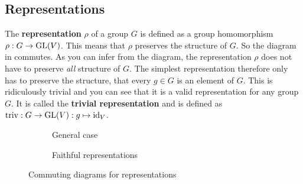 \subsection{Representations}

The \textbf{representation} $\rho$ of a group $G$ is defined as a group homomorphism $\rho: G \to \operatorname{GL}(V)$.
This means that $\rho$ preserves the structure of $G$.
So the diagram in  commutes.
As you can infer from the diagram, the representation $\rho$ does not have to preserve \textit{all} structure of $G$.
The simplest representation therefore only has to preserve the structure, that every $g \in G$ is an element of $G$.
This is ridiculously trivial and you can see that it is a valid representation for any group $G$.
It is called the \textbf{trivial representation} and is defined as $\operatorname{triv}: G \to \operatorname{GL}(V): g \mapsto \operatorname{id}_V$.

\begin{figure}[h]
    \begin{subfigure}{.5 \textwidth}
        \centering
        \caption{General case}
        \label{fig:main.what.rep-cd}
    \end{subfigure}
    \begin{subfigure}{.5 \textwidth}
        \centering
        \caption{Faithful representations}
        \label{fig:main.what.faith-rep-cd}
    \end{subfigure}
    \caption{Commuting diagrams for representations}
\end{figure}

